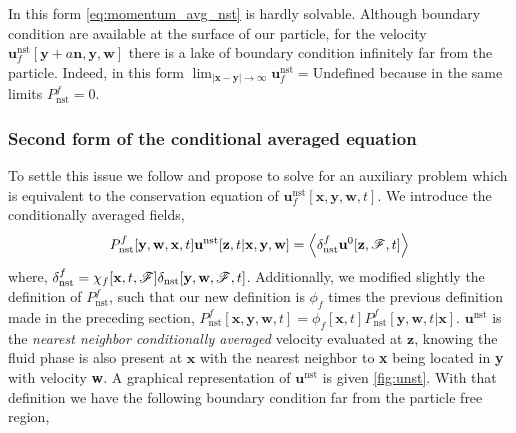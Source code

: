 In this form \ref{eq:momentum_avg_nst} is hardly solvable. 
Although boundary condition are available at the surface of our particle, for the velocity $\textbf{u}_f^\text{nst}[\textbf{y}+a \textbf{n}, \textbf{y},\textbf{w}]$ there is a lake of boundary condition infinitely far from the particle. 
Indeed, in this form $\lim_{|\textbf{x}- \textbf{y}|\to \infty} \textbf{u}^\text{nst}_f = \text{Undefined}$ because in the same limits $P_\text{nst}^f = 0$. 

\subsubsection{Second form of the conditional averaged equation}

To settle this issue we follow \citet[Appendix B]{zhang2021ensemble} and propose to solve for an auxiliary problem which is equivalent to the conservation equation of $\textbf{u}_f^\text{nst}[\textbf{x},\textbf{y},\textbf{w},t]$. 
We introduce the conditionally averaged fields, 
\begin{equation*}
    P_\text{nst}^f[\textbf{y},\textbf{w},\textbf{x},t]\textbf{u}^\text{nst}[\textbf{z},t|\textbf{x},\textbf{y},\textbf{w}]
    = \avg{\delta_\text{nst}^f  \textbf{u}^0[\textbf{z},\FF,t]}
    \label{eq:def_u_z}
\end{equation*}
where, $\delta_\text{nst}^f = \chi_f[\textbf{x},t,\mathscr{F}]\delta_\text{nst}[\textbf{y},\textbf{w}, \mathscr{F},t]$. 
Additionally, we modified slightly the definition of $P_\text{nst}^f$, such that our new definition  is $\phi_f$ times the previous definition made in the preceding section, $P_\text{nst}^f[\textbf{x},\textbf{y},\textbf{w},t] = \phi_f[\textbf{x},t]P_\text{nst}^f[\textbf{y},\textbf{w},t|\textbf{x}]$. 
$\textbf{u}^\text{nst}$ is the \textit{nearest neighbor conditionally averaged} velocity evaluated at $\textbf{z}$, knowing the fluid phase is also present at $\textbf{x}$ with the nearest neighbor to \textbf{x} being located in \textbf{y} with velocity \textbf{w}. 
A graphical representation of $\textbf{u}^\text{nst}$ is given \ref{fig:unst}.
With that definition we have the following boundary condition far from the particle free region, 
